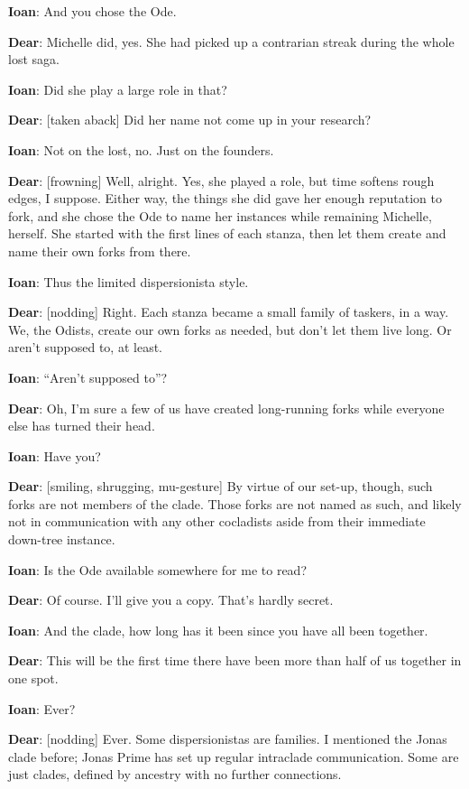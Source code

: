 \textbf{Ioan}: And you chose the Ode.

\textbf{Dear}: Michelle did, yes. She had picked up a contrarian streak during the whole lost saga.

\textbf{Ioan}: Did she play a large role in that?

\textbf{Dear}: {[}taken aback{]} Did her name not come up in your research?

\textbf{Ioan}: Not on the lost, no. Just on the founders.

\textbf{Dear}: {[}frowning{]} Well, alright. Yes, she played a role, but time softens rough edges, I suppose. Either way, the things she did gave her enough reputation to fork, and she chose the Ode to name her instances while remaining Michelle, herself. She started with the first lines of each stanza, then let them create and name their own forks from there.

\textbf{Ioan}: Thus the limited dispersionista style.

\textbf{Dear}: {[}nodding{]} Right. Each stanza became a small family of taskers, in a way. We, the Odists, create our own forks as needed, but don't let them live long. Or aren't supposed to, at least.

\textbf{Ioan}: ``Aren't supposed to''?

\textbf{Dear}: Oh, I'm sure a few of us have created long-running forks while everyone else has turned their head.

\textbf{Ioan}: Have you?

\textbf{Dear}: {[}smiling, shrugging, mu-gesture{]} By virtue of our set-up, though, such forks are not members of the clade. Those forks are not named as such, and likely not in communication with any other cocladists aside from their immediate down-tree instance.

\textbf{Ioan}: Is the Ode available somewhere for me to read?

\textbf{Dear}: Of course. I'll give you a copy. That's hardly secret.

\textbf{Ioan}: And the clade, how long has it been since you have all been together.

\textbf{Dear}: This will be the first time there have been more than half of us together in one spot.

\textbf{Ioan}: Ever?

\textbf{Dear}: {[}nodding{]} Ever. Some dispersionistas are families. I mentioned the Jonas clade before; Jonas Prime has set up regular intraclade communication. Some are just clades, defined by ancestry with no further connections.

